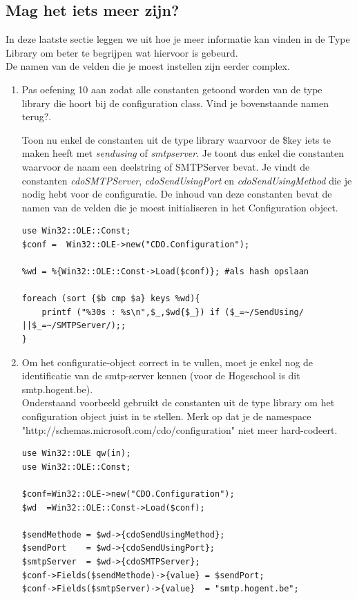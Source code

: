 \documentclass[11pt,a4paper]{report}
\begin{document}
\subsection{Mag het iets meer zijn?}
In deze laatste sectie leggen we uit hoe je meer informatie kan vinden in de Type Library om beter te begrijpen wat hiervoor is gebeurd.\\
De namen van de velden die je moest instellen zijn eerder complex.
\begin{enumerate}[resume]
	\item Pas oefening 10 aan zodat alle constanten getoond worden van de type library die hoort bij de configuration class. Vind je bovenstaande namen terug?.
	\par Toon nu enkel de constanten uit de type library waarvoor de \$key iets te maken heeft met \textit{sendusing} of \textit{smtpserver}. Je toont dus enkel die constanten waarvoor de naam een deelstring \textit{} of SMTPServer bevat. Je vindt de constanten \textit{cdoSMTPServer}, \textit{cdoSendUsingPort} en \textit{cdoSendUsingMethod} die je nodig hebt voor de configuratie. De inhoud van deze constanten bevat de namen van de velden die je moest initialiseren in het Configuration object.
\begin{lstlisting}
use Win32::OLE::Const;
$conf =  Win32::OLE->new("CDO.Configuration");

%wd = %{Win32::OLE::Const->Load($conf)}; #als hash opslaan

foreach (sort {$b cmp $a} keys %wd){
	printf ("%30s : %s\n",$_,$wd{$_}) if ($_=~/SendUsing/ ||$_=~/SMTPServer/);;
} 
\end{lstlisting}
	\item Om het configuratie-object correct in te vullen, moet je enkel nog de identificatie van de smtp-server kennen (voor de Hogeschool is dit smtp.hogent.be).\\
	Onderstaand voorbeeld gebruikt de constanten uit de type library om het configuration object juist in te stellen. Merk op dat je de namespace "http://schemas.microsoft.com/cdo/configuration" niet meer hard-codeert.
\begin{lstlisting}
use Win32::OLE qw(in);
use Win32::OLE::Const;

$conf=Win32::OLE->new("CDO.Configuration");
$wd  =Win32::OLE::Const->Load($conf);

$sendMethode = $wd->{cdoSendUsingMethod}; 
$sendPort    = $wd->{cdoSendUsingPort};
$smtpServer  = $wd->{cdoSMTPServer};
$conf->Fields($sendMethode)->{value} = $sendPort;
$conf->Fields($smtpServer)->{value}  = "smtp.hogent.be"; 


\end{lstlisting}
\end{enumerate}
\end{document}
